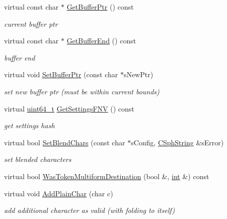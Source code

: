 \begin{DoxyCompactItemize}
virtual const char $\ast$ \hyperlink{classCSphTokenizerBase_a02fc1abec6096ccbf09618533ef9f11d}{Get\-Buffer\-Ptr} () const 
\begin{DoxyCompactList}\small\item\em current buffer ptr \end{DoxyCompactList}\item 
virtual const char $\ast$ \hyperlink{classCSphTokenizerBase_a904d68c4ade0504999397296c5b2f453}{Get\-Buffer\-End} () const 
\begin{DoxyCompactList}\small\item\em buffer end \end{DoxyCompactList}\item 
virtual void \hyperlink{classCSphTokenizerBase_a7c505eb86e6ac16989d8a93ec774b5c5}{Set\-Buffer\-Ptr} (const char $\ast$s\-New\-Ptr)
\begin{DoxyCompactList}\small\item\em set new buffer ptr (must be within current bounds) \end{DoxyCompactList}\item 
virtual \hyperlink{sphinxstd_8h_aaa5d1cd013383c889537491c3cfd9aad}{uint64\-\_\-t} \hyperlink{classCSphTokenizerBase_a8b1960afe3b3f462cc266f3f67dd6e59}{Get\-Settings\-F\-N\-V} () const 
\begin{DoxyCompactList}\small\item\em get settings hash \end{DoxyCompactList}\item 
virtual bool \hyperlink{classCSphTokenizerBase_a6ed4c6bcb163ade2c9c0cbc5c9698030}{Set\-Blend\-Chars} (const char $\ast$s\-Config, \hyperlink{structCSphString}{C\-Sph\-String} \&s\-Error)
\begin{DoxyCompactList}\small\item\em set blended characters \end{DoxyCompactList}\item 
virtual bool \hyperlink{classCSphTokenizerBase_aecf8b6afd0721709d64841dc466d999f}{Was\-Token\-Multiform\-Destination} (bool \&, \hyperlink{sphinxexpr_8cpp_a4a26e8f9cb8b736e0c4cbf4d16de985e}{int} \&) const 
\item 
virtual void \hyperlink{classCSphTokenizerBase_a2e148d4af7e80a0d9096d427218e3843}{Add\-Plain\-Char} (char c)
\begin{DoxyCompactList}\small\item\em add additional character as valid (with folding to itself) \end{DoxyCompactList}\item 

\end{DoxyCompactItemize}
